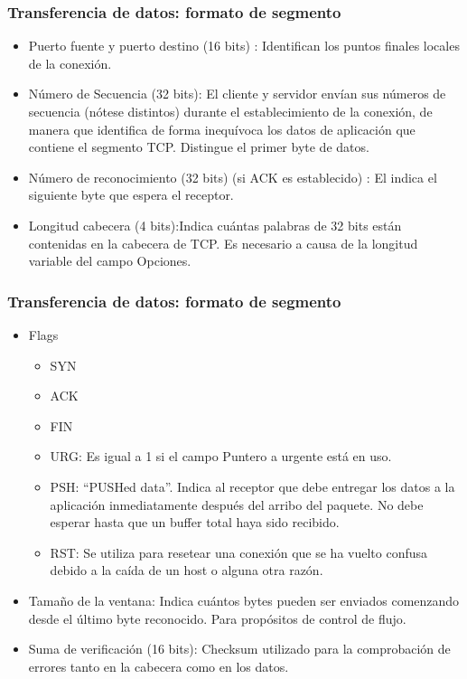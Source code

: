 \documentclass{beamer}
\begin{document}
\begin{frame}
\frametitle{Transferencia de datos: formato de segmento}
\begin{itemize}
\item Puerto fuente y puerto destino (16 bits) : Identifican los puntos finales locales de la conexión.
\item Número de Secuencia (32 bits): El cliente y servidor envían sus números de secuencia (nótese distintos) durante el establecimiento de la conexión, de manera que identifica de forma inequívoca los datos de aplicación que contiene el segmento TCP. Distingue el primer byte de datos.
\item Número de reconocimiento (32 bits) (si ACK es establecido) : El indica el siguiente byte que espera el receptor.
\item Longitud cabecera (4 bits):Indica cuántas palabras de 32 bits están contenidas en la cabecera de TCP. Es necesario a causa de la longitud variable del campo Opciones.
\end{itemize}
\end{frame}

\begin{frame}
\frametitle{Transferencia de datos: formato de segmento}
\begin{itemize}
\item Flags
\begin{itemize}
\item SYN
\item ACK
\item FIN
\item URG: Es igual a 1 si el campo Puntero a urgente está en uso. 
\item PSH: “PUSHed data”. Indica al receptor que debe entregar los datos a la aplicación inmediatamente después del arribo del paquete. No debe esperar hasta que un buffer total haya sido recibido.
\item RST: Se utiliza para resetear una conexión que se ha vuelto confusa debido a la caída de un host o alguna otra razón.
\end{itemize}
\item Tamaño de la ventana: Indica cuántos bytes pueden ser enviados comenzando desde el último byte reconocido. Para propósitos de control de flujo.
\item Suma de verificación (16 bits): Checksum utilizado para la comprobación de errores tanto en la cabecera como en los datos.
\end{itemize}
\end{frame}
\end{document}
